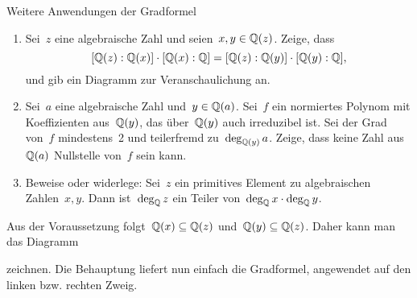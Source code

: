 \documentclass{algblatt}
\begin{document}
\vspace*{-1.5cm}

\begin{aufgabe}{Weitere Anwendungen der Gradformel}
\begin{enumerate}
\item Sei~$z$ eine algebraische Zahl und seien~$x, y \in \mathbb{Q}(z)$. Zeige, dass
\[ [\mathbb{Q}(z):\mathbb{Q}(x)] \cdot [\mathbb{Q}(x):\mathbb{Q}] = [\mathbb{Q}(z):\mathbb{Q}(y)] \cdot
[\mathbb{Q}(y):\mathbb{Q}], \]
und gib ein Diagramm zur Veranschaulichung an.
\item Sei~$a$ eine algebraische Zahl und~$y \in \mathbb{Q}(a)$. Sei~$f$ ein normiertes
Polynom mit Koeffizienten aus~$\mathbb{Q}(y)$, das über~$\mathbb{Q}(y)$ auch
irreduzibel ist. Sei der Grad von~$f$ mindestens~2 und teilerfremd
zu~$\deg_{\mathbb{Q}(y)} a$. Zeige, dass keine Zahl aus~$\mathbb{Q}(a)$ Nullstelle von~$f$
sein kann.

\item Beweise oder widerlege: Sei~$z$ ein primitives Element zu algebraischen
Zahlen~$x, y$. Dann ist~$\deg_{\mathbb{Q}} z$ ein Teiler von~$\deg_{\mathbb{Q}} x \cdot \deg_{\mathbb{Q}}
y$.
\end{enumerate}

\begin{loesungE}
\item Aus der Voraussetzung folgt~$\mathbb{Q}(x) \subseteq \mathbb{Q}(z)$ und~$\mathbb{Q}(y)
\subseteq \mathbb{Q}(z)$. Daher kann man das Diagramm
\begin{center}\end{center}
zeichnen. Die Behauptung liefert nun einfach die Gradformel, angewendet auf den
linken bzw. rechten Zweig.


\end{loesungE}
\end{aufgabe}
\end{document}
